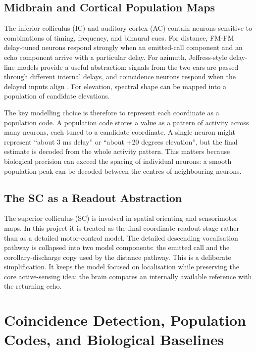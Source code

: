 \subsection{Midbrain and Cortical Population Maps}

The inferior colliculus (IC) and auditory cortex (AC) contain neurons sensitive to combinations of timing, frequency, and binaural cues. For distance, FM-FM delay-tuned neurons respond strongly when an emitted-call component and an echo component arrive with a particular delay. For azimuth, Jeffress-style delay-line models provide a useful abstraction: signals from the two ears are passed through different internal delays, and coincidence neurons respond when the delayed inputs align \cite{Jeffress1948ALocalization}. For elevation, spectral shape can be mapped into a population of candidate elevations.

The key modelling choice is therefore to represent each coordinate as a population code. A population code stores a value as a pattern of activity across many neurons, each tuned to a candidate coordinate. A single neuron might represent ``about 3 ms delay'' or ``about +20 degrees elevation'', but the final estimate is decoded from the whole activity pattern. This matters because biological precision can exceed the spacing of individual neurons: a smooth population peak can be decoded between the centres of neighbouring neurons.

\subsection{The SC as a Readout Abstraction}

The superior colliculus (SC) is involved in spatial orienting and sensorimotor maps. In this project it is treated as the final coordinate-readout stage rather than as a detailed motor-control model. The detailed descending vocalisation pathway is collapsed into two model components: the emitted call and the corollary-discharge copy used by the distance pathway. This is a deliberate simplification. It keeps the model focused on localisation while preserving the core active-sensing idea: the brain compares an internally available reference with the returning echo.


\section{Coincidence Detection, Population Codes, and Biological Baselines}
\label{sec:coincidence_background}

